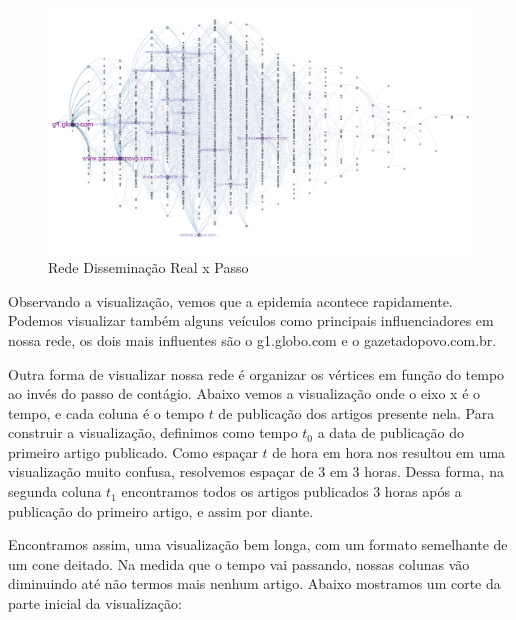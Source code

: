 \documentclass[a4paper,12pt]{article}
\begin{document}
\begin{flushleft}
  \begin{figure}[ht]
  \includegraphics[scale=0.5]{../results/a.png}
  \caption{Rede Disseminação Real x Passo}
  \end{figure}
\end{flushleft}
\pagebreak

Observando a visualização, vemos que a epidemia acontece rapidamente. Podemos visualizar também alguns veículos como principais influenciadores
em nossa rede, os dois mais influentes são o g1.globo.com e o gazetadopovo.com.br.

Outra forma de visualizar nossa rede é organizar os vértices em função do tempo ao invés do passo de contágio. Abaixo vemos a visualização
onde o eixo x é o tempo, e cada coluna é o tempo $t$ de publicação dos artigos presente nela. Para construir a visualização, definimos
como tempo $t_{0}$ a data de publicação do primeiro artigo publicado. Como espaçar $t$ de hora em hora nos resultou em uma visualização muito confusa,
 resolvemos espaçar de 3 em 3 horas. Dessa forma, na segunda coluna $t_{1}$ encontramos todos os artigos publicados 3 horas após a publicação
 do primeiro artigo, e assim por diante.

Encontramos assim, uma visualização bem longa, com um formato semelhante de um cone deitado. Na medida que o tempo vai passando, nossas
colunas vão diminuindo até não termos mais nenhum artigo. Abaixo mostramos um corte da parte inicial da visualização:
\end{document}
